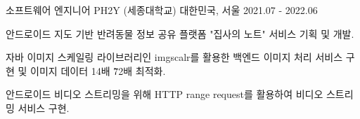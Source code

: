 \begin{cventries}
  \cventry
    {소프트웨어 엔지니어} %
    {PH2Y (세종대학교)} %
    {대한민국, 서울} %
    {2021.07 - 2022.06} %
    {
      \begin{cvitems} %
        \item {안드로이드 지도 기반 반려동물 정보 공유 플랫폼 "집사의 노트" 서비스 기획 및 개발.}
        \item {자바 이미지 스케일링 라이브러리인 imgscalr를 활용한 백엔드 이미지 처리 서비스 구현 및 이미지 데이터 14배 \~ 72배 최적화.}
        \item {안드로이드 비디오 스트리밍을 위해 HTTP range request를 활용하여 비디오 스트리밍 서비스 구현.}
      \end{cvitems}
    }


\end{cventries}
